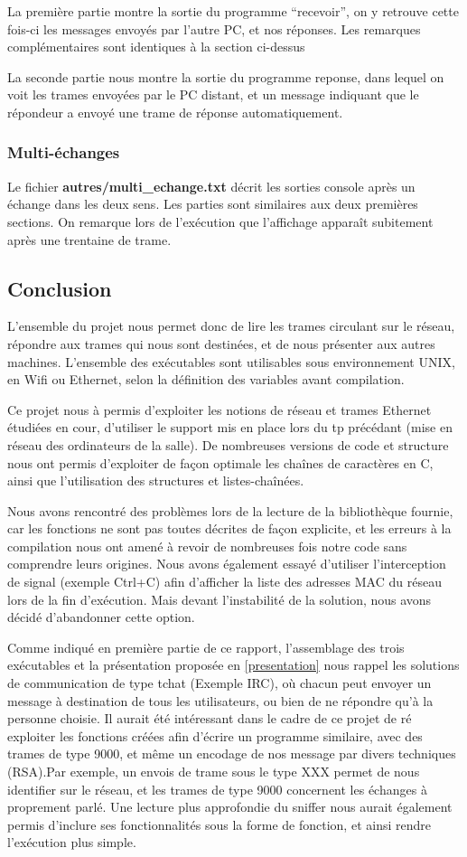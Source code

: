 \documentclass[a4paper,11pt]{article}
\begin{document}
	La première partie montre la sortie du programme ``recevoir'', on y retrouve cette fois-ci les messages envoyés par l'autre PC, et nos réponses. Les remarques complémentaires sont identiques à la section ci-dessus
	
	La seconde partie nous montre la sortie du programme reponse, dans lequel on voit les trames envoyées par le PC distant, et un message indiquant que le répondeur a envoyé une trame de réponse automatiquement.
	\subsubsection{Multi-échanges}
	Le fichier \textbf{autres/multi\_echange.txt} décrit les sorties console après un échange dans les deux sens. Les parties sont similaires aux deux premières sections. On remarque lors de l'exécution que l'affichage apparaît subitement après une trentaine de trame.
	
	\subsection{Conclusion}
	L'ensemble du projet nous permet donc de lire les trames circulant sur le réseau, répondre aux trames qui nous sont destinées, et de nous présenter aux autres machines. L'ensemble des exécutables sont utilisables sous environnement UNIX, en Wifi ou Ethernet, selon la définition des variables avant compilation.
	
	Ce projet nous à permis d'exploiter les notions de réseau et trames Ethernet étudiées en cour, d'utiliser le support mis en place lors du tp précédant (mise en réseau des ordinateurs de la salle). De nombreuses versions de code et structure nous ont permis d'exploiter de façon optimale les chaînes de caractères en C, ainsi que l'utilisation des structures et listes-chaînées.
	
	Nous avons rencontré des problèmes lors de la lecture de la bibliothèque fournie, car les fonctions ne sont pas toutes décrites de façon explicite, et les erreurs à la compilation nous ont amené à revoir de nombreuses fois notre code sans comprendre leurs origines. Nous avons également essayé d'utiliser l'interception de signal (exemple Ctrl+C) afin d'afficher la liste des adresses MAC du réseau lors de la fin d'exécution. Mais devant l'instabilité de la solution, nous avons décidé d'abandonner cette option.
	
	Comme indiqué en première partie de ce rapport, l'assemblage des trois exécutables et la présentation proposée en \ref{presentation} nous rappel les solutions de communication de type tchat (Exemple IRC), où chacun peut envoyer un message à destination de tous les utilisateurs, ou bien de ne répondre qu'à la personne choisie. Il aurait été intéressant dans le cadre de ce projet de ré exploiter les fonctions créées afin d'écrire un programme similaire, avec des trames de type 9000, et même un encodage de nos message par divers techniques (RSA).Par exemple, un envois de trame sous le type XXX permet de nous identifier sur le réseau, et les trames de type 9000 concernent les échanges à proprement parlé. Une lecture plus approfondie du sniffer nous aurait également permis d'inclure ses fonctionnalités sous la forme de fonction, et ainsi rendre l'exécution plus simple.
\end{document}
